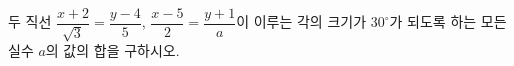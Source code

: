 두 직선 $\dfrac{x+2}{\sqrt{3}}=\dfrac{y-4}{5}$, $\dfrac{x-5}{2}=\dfrac{y+1}{a}$이 이루는 각의 크기가 $30^\circ$가 되도록 하는 모든 실수 $a$의 값의 합을 구하시오.
